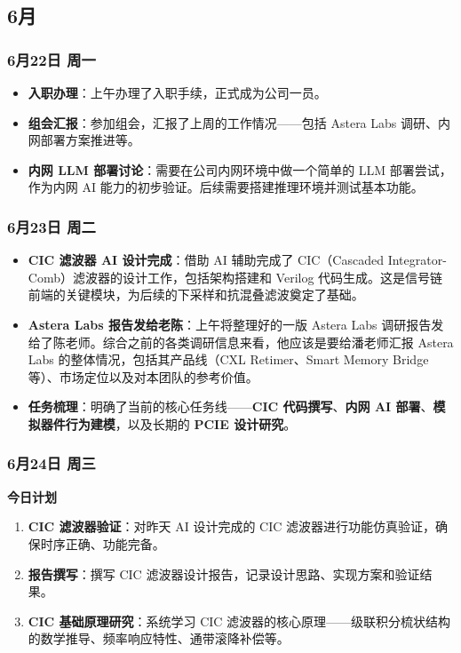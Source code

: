 \subsection{6月}

\subsubsection{6月22日 周一}

\begin{itemize}
  \item \textbf{入职办理}：上午办理了入职手续，正式成为公司一员。
  \item \textbf{组会汇报}：参加组会，汇报了上周的工作情况——包括 Astera Labs 调研、内网部署方案推进等。
  \item \textbf{内网 LLM 部署讨论}：需要在公司内网环境中做一个简单的 LLM 部署尝试，作为内网 AI 能力的初步验证。后续需要搭建推理环境并测试基本功能。
\end{itemize}

\subsubsection{6月23日 周二}

\begin{itemize}
  \item \textbf{CIC 滤波器 AI 设计完成}：借助 AI 辅助完成了 CIC（Cascaded Integrator-Comb）滤波器的设计工作，包括架构搭建和 Verilog 代码生成。这是信号链前端的关键模块，为后续的下采样和抗混叠滤波奠定了基础。
  \item \textbf{Astera Labs 报告发给老陈}：上午将整理好的一版 Astera Labs 调研报告发给了陈老师。综合之前的各类调研信息来看，他应该是要给潘老师汇报 Astera Labs 的整体情况，包括其产品线（CXL Retimer、Smart Memory Bridge 等）、市场定位以及对本团队的参考价值。
  \item \textbf{任务梳理}：明确了当前的核心任务线——\textbf{CIC 代码撰写}、\textbf{内网 AI 部署}、\textbf{模拟器件行为建模}，以及长期的 \textbf{PCIE 设计研究}。
\end{itemize}

\subsubsection{6月24日 周三}

\begin{taskbox}
\textbf{今日计划}
\begin{enumerate}
  \item \textbf{CIC 滤波器验证}：对昨天 AI 设计完成的 CIC 滤波器进行功能仿真验证，确保时序正确、功能完备。
  \item \textbf{报告撰写}：撰写 CIC 滤波器设计报告，记录设计思路、实现方案和验证结果。
  \item \textbf{CIC 基础原理研究}：系统学习 CIC 滤波器的核心原理——级联积分梳状结构的数学推导、频率响应特性、通带滚降补偿等。
\end{enumerate}
\end{taskbox}

